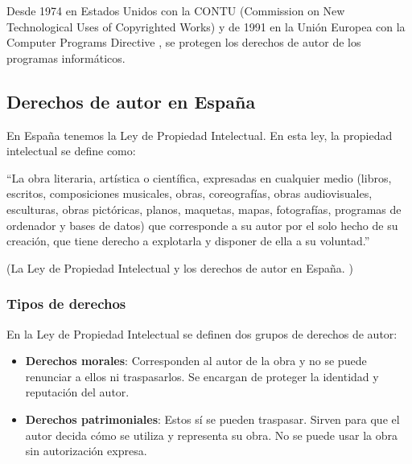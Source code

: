             Desde 1974 en Estados Unidos con la CONTU \cite{contu} (Commission on New Technological Uses of Copyrighted
            Works) y de 1991 en la Unión Europea con la Computer Programs Directive \cite{com_pro_dir}, se protegen los
            derechos de autor de los programas informáticos.


        \subsection{Derechos de autor en España} %
        \label{sub:DerechosDeAutorEnEspana}

            En España tenemos la Ley de Propiedad Intelectual. En esta ley, la propiedad intelectual se define como:

            ``La obra literaria, artística o científica, expresadas en cualquier medio (libros, escritos, composiciones
            musicales, obras, coreografías, obras audiovisuales, esculturas, obras pictóricas, planos, maquetas, mapas,
            fotografías, programas de ordenador y bases de datos) que corresponde a su autor por el solo hecho de su
            creación, que tiene derecho a explotarla y disponer de ella a su voluntad.''

            \begin{flushright}
                (La Ley de Propiedad Intelectual y los derechos de autor en España. \cite{propiedad_intelectual_espana})
            \end{flushright}

            \subsubsection{Tipos de derechos} %
            \label{ssub:TiposDeDerechos}

                En la Ley de Propiedad Intelectual se definen dos grupos de derechos de autor:

                \begin{itemize}
                    \item \textbf{Derechos morales}: Corresponden al autor de la obra y no se puede renunciar a ellos ni
                    traspasarlos. Se encargan de proteger la identidad y reputación del autor.
                    \item \textbf{Derechos patrimoniales}: Estos sí se pueden traspasar. Sirven para que el autor decida
                    cómo se utiliza y representa su obra. No se puede usar la obra sin autorización expresa.
                \end{itemize}

